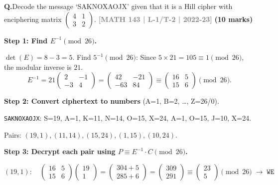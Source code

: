 \documentclass[12pt,a3paper]{article}
\newcommand{\yr}[1]{\hfill\textcolor{gray}{\small\textbf{[#1]}}}
\newcommand{\mk}[1]{\textcolor{orange!70!black}{\small\textbf{(#1 marks)}}}
\newcounter{qnum}
\newcommand{\Q}[1]{%
  \needspace{4\baselineskip}
  \refstepcounter{qnum}
  \vspace{6pt}
  \noindent\textbf{Q\theqnum.}\enspace #1\par
}
\begin{document}
\Q{Decode the message `SAKNOXAOJX' given that it is a Hill cipher with enciphering matrix $\begin{pmatrix} 4 & 1 \\ 3 & 2 \end{pmatrix}$.
\yr{MATH 143 | L-1/T-2 | 2022-23} \mk{10}}

 
\begin{tcolorbox}[enhanced,breakable,
  colback=cA!4,colframe=cA,boxrule=0.8pt,arc=5pt,
  title={\textbf{Answer --- Decode \texttt{SAKNOXAOJX},
    $E=\begin{pmatrix}4&1\\3&2\end{pmatrix}$ (A=1)}},
  fonttitle=\bfseries\color{white},colbacktitle=cA]

\textbf{Step 1: Find $E^{-1} \pmod{26}$.}

$\det(E) = 8-3=5$. Find $5^{-1}\pmod{26}$: Since $5\times21=105 \equiv 1 \pmod{26}$, the modular inverse is $21$.
\[
E^{-1} = 21\begin{pmatrix}2&-1\\-3&4\end{pmatrix}
= \begin{pmatrix}42&-21\\-63&84\end{pmatrix}
\equiv \begin{pmatrix}16&5\\15&6\end{pmatrix}\pmod{26}.
\]

\medskip
\textbf{Step 2: Convert ciphertext to numbers} (A=1, B=2, \ldots, Z=26/0).

\texttt{SAKNOXAOJX}: S=19, A=1, K=11, N=14, O=15, X=24, A=1, O=15, J=10, X=24.

Pairs: $(19,1), (11,14), (15,24), (1,15), (10,24)$.

\medskip
\textbf{Step 3: Decrypt each pair using $P \equiv E^{-1} \cdot C \pmod{26}$.}

\[
(19,1):\quad
\begin{pmatrix}16&5\\15&6\end{pmatrix}\begin{pmatrix}19\\1\end{pmatrix}
=\begin{pmatrix}304+5\\285+6\end{pmatrix}
=\begin{pmatrix}309\\291\end{pmatrix}
\equiv\begin{pmatrix}23\\5\end{pmatrix}\pmod{26}
\;\to\;\texttt{WE}
\]


\end{tcolorbox}
\end{document}
